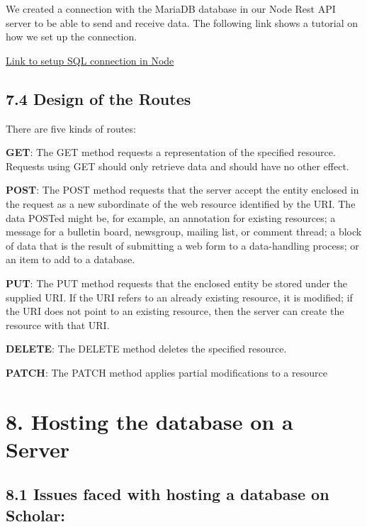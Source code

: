 \documentclass[]{book}
\begin{document}
We created a connection with the MariaDB database in our Node Rest API server to be able to send and receive data. The following link shows a tutorial on how we set up the connection.

\href{https://bezkoder.com/node-js-rest-api-express-mysql/}{Link to setup SQL connection in Node}

\hypertarget{design-of-the-routes}{%
\subsection{7.4 Design of the Routes}\label{design-of-the-routes}}

There are five kinds of routes:

\textbf{GET}: The GET method requests a representation of the specified resource. Requests using GET should only retrieve data and should have no other effect.

\textbf{POST}: The POST method requests that the server accept the entity enclosed in the request as a new subordinate of the web resource identified by the URI. The data POSTed might be, for example, an annotation for existing resources; a message for a bulletin board, newsgroup, mailing list, or comment thread; a block of data that is the result of submitting a web form to a data-handling process; or an item to add to a database.

\textbf{PUT}: The PUT method requests that the enclosed entity be stored under the supplied URI. If the URI refers to an already existing resource, it is modified; if the URI does not point to an existing resource, then the server can create the resource with that URI.

\textbf{DELETE}: The DELETE method deletes the specified resource.

\textbf{PATCH}: The PATCH method applies partial modifications to a resource

\hypertarget{hosting-the-database-on-a-server}{%
\section{8. Hosting the database on a Server}\label{hosting-the-database-on-a-server}}

\hypertarget{issues-faced-with-hosting-a-database-on-scholar}{%
\subsection{8.1 Issues faced with hosting a database on Scholar:}\label{issues-faced-with-hosting-a-database-on-scholar}}
\end{document}
